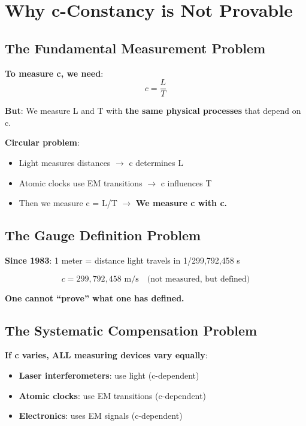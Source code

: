 	\section{Why c-Constancy is Not Provable}
	
	\subsection{The Fundamental Measurement Problem}
	
	\textbf{To measure c, we need}:
	\begin{equation}
		c = \frac{L}{T}
	\end{equation}
	
	\textbf{But}: We measure L and T with \textbf{the same physical processes} that depend on c.
	
	\textbf{Circular problem}:
	\begin{itemize}
		\item Light measures distances $\rightarrow$ c determines L
		\item Atomic clocks use EM transitions $\rightarrow$ c influences T
		\item Then we measure c = L/T $\rightarrow$ \textbf{We measure c with c.}
	\end{itemize}
	
	\subsection{The Gauge Definition Problem}
	
	\textbf{Since 1983}: 1 meter = distance light travels in 1/299,792,458 s
	
	\begin{equation}
		c = 299,792,458 \text{ m/s} \quad \text{(not measured, but defined)}
	\end{equation}
	
	\textbf{One cannot ``prove'' what one has defined.}
	
	\subsection{The Systematic Compensation Problem}
	
	\textbf{If c varies, ALL measuring devices vary equally}:
	\begin{itemize}
		\item \textbf{Laser interferometers}: use light (c-dependent)
		\item \textbf{Atomic clocks}: use EM transitions (c-dependent)
		\item \textbf{Electronics}: uses EM signals (c-dependent)
	\end{itemize}
	
